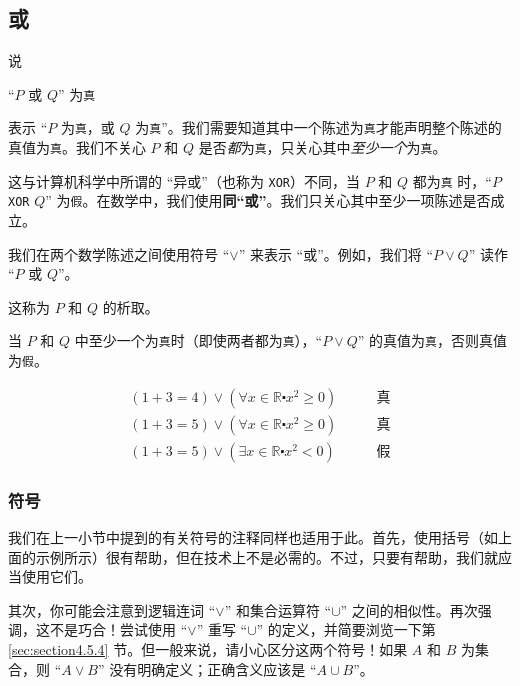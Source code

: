 \subsection{或}

说
\begin{center}
    ``$P$ 或 $Q$'' 为\verb|真|
\end{center}

表示 ``$P$ 为\verb|真|，或 $Q$ 为\verb|真|''。我们需要知道其中一个陈述为\verb|真|才能声明整个陈述的真值为\verb|真|。我们不关心 $P$ 和 $Q$ 是否\emph{都}为\verb|真|，只关心其中\emph{至少一个}为\verb|真|。

这与计算机科学中所谓的 ``异或''（也称为 \verb|XOR|）不同，当 $P$ 和 $Q$ 都为\verb|真| 时，``$P$ \verb|XOR| $Q$'' 为\verb|假|。在数学中，我们使用\textbf{同``或''}。我们只关心其中至少一项陈述是否成立。

\begin{definition}
    我们在两个数学陈述之间使用符号 ``$\lor$'' 来表示 ``或''。例如，我们将 ``$P \lor Q$'' 读作 ``$P$ 或 $Q$''。

    这称为 $P$ 和 $Q$ 的析取。

    当 $P$ 和 $Q$ 中至少一个为\verb|真|时（即使两者都为\verb|真|），``$P \lor Q$'' 的真值为\verb|真|，否则真值为\verb|假|。
\end{definition}

\begin{example}
    \begin{align*}
        (1 + 3 = 4) \lor (\forall x \in \mathbb{R} \centerdot x^2 \ge 0) \qquad &\text{真} \\
        (1 + 3 = 5) \lor (\forall x \in \mathbb{R} \centerdot x^2 \ge 0) \qquad &\text{真} \\
        (1 + 3 = 5) \lor (\exists x \in \mathbb{R} \centerdot x^2 < 0)   \qquad &\text{假}
    \end{align*}
\end{example}

\subsubsection*{符号}

我们在上一小节中提到的有关符号的注释同样也适用于此。首先，使用括号（如上面的示例所示）很有帮助，但在技术上不是必需的。不过，只要有帮助，我们就应当使用它们。

其次，你可能会注意到逻辑连词 ``$\lor$'' 和集合运算符 ``$\cup$'' 之间的相似性。再次强调，这不是巧合！尝试使用 ``$\lor$'' 重写 ``$\cup$'' 的定义，并简要浏览一下第 \ref{sec:section4.5.4} 节。但一般来说，请小心区分这两个符号！如果 $A$ 和 $B$ 为集合，则 ``$A \lor B$'' 没有明确定义；正确含义应该是 ``$A \cup B$''。

